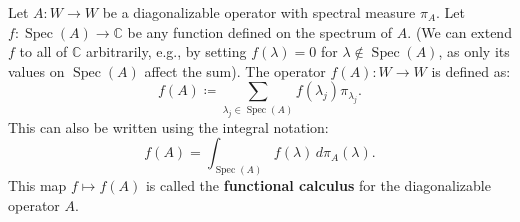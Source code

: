 \begin{definition}
\label{def:functional_calculus}
Let $A: W \to W$ be a diagonalizable operator with spectral measure $\pi_A$. Let $f: \operatorname{Spec}(A) \to \mathbb{C}$ be any function defined on the spectrum of $A$. (We can extend $f$ to all of $\mathbb{C}$ arbitrarily, e.g., by setting $f(\lambda)=0$ for $\lambda \notin \operatorname{Spec}(A)$, as only its values on $\operatorname{Spec}(A)$ affect the sum). The operator $f(A): W \to W$ is defined as:
\begin{equation} \label{eq:4.16}
f(A) \coloneqq \sum_{\lambda_j \in \operatorname{Spec}(A)} f(\lambda_j) \pi_{\lambda_j}.
\end{equation}
This can also be written using the integral notation:
\[ f(A) = \int_{\operatorname{Spec}(A)} f(\lambda) \, d\pi_A(\lambda). \]
This map $f \mapsto f(A)$ is called the \textbf{functional calculus} for the diagonalizable operator $A$.
\end{definition}

